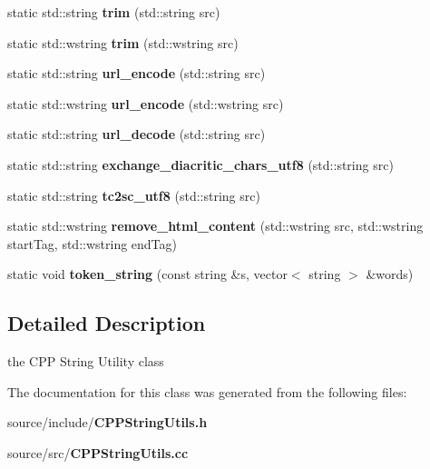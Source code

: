 \begin{CompactItemize}
\item 
static std::string \textbf{trim} (std::string src)\label{classCPPStringUtils_b7a95fcceb8e9f6b6057a18e7b1c2f53}

\item 
static std::wstring \textbf{trim} (std::wstring src)\label{classCPPStringUtils_07879a0daa3a9f7cd25a049748c41db3}

\item 
static std::string \textbf{url\_\-encode} (std::string src)\label{classCPPStringUtils_14302e8f40ec5a1f50438ce2bedf6c5b}

\item 
static std::wstring \textbf{url\_\-encode} (std::wstring src)\label{classCPPStringUtils_57bcbcff310f55d63c05ef58c3fdca9e}

\item 
static std::string \textbf{url\_\-decode} (std::string src)\label{classCPPStringUtils_30f71ace44cdd9bae744c018c36a96a7}

\item 
static std::string \textbf{exchange\_\-diacritic\_\-chars\_\-utf8} (std::string src)\label{classCPPStringUtils_3e08b33f820af5fd7dae1d5f36752883}

\item 
static std::string \textbf{tc2sc\_\-utf8} (std::string src)\label{classCPPStringUtils_24d84b208e576d598d10b6558ca97953}

\item 
static std::wstring \textbf{remove\_\-html\_\-content} (std::wstring src, std::wstring startTag, std::wstring endTag)\label{classCPPStringUtils_4b042a97935f3bc248c10967b45e9fa6}

\item 
static void \textbf{token\_\-string} (const string \&s, vector$<$ string $>$ \&words)\label{classCPPStringUtils_c038f1e9530c1b53edaeea1bb5d8e547}

\end{CompactItemize}


\subsection{Detailed Description}
the CPP String Utility class 

The documentation for this class was generated from the following files:\begin{CompactItemize}
\item 
source/include/{\bf CPPStringUtils.h}\item 
source/src/{\bf CPPStringUtils.cc}\end{CompactItemize}
